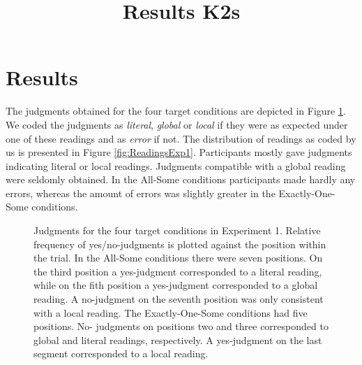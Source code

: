 \documentclass[a4paper,10pt]{article}
\title{Results K2s}
\author{}
\begin{document}
\maketitle

\begin{abstract}

\end{abstract}

\section{Results}
The judgments obtained for the four target conditions are depicted   in Figure \ref{fig:JudgmentsK2}.  We coded the judgments as {\it literal}, {\it global} or {\it local} if they were as expected under one of these readings and as {\it error} if not. The distribution of readings as coded by us is presented in Figure \ref{fig:ReadingsExp1}. Participants mostly gave judgments indicating literal or local readings. Judgments compatible with a global reading were seldomly obtained. In the All-Some conditions participants made hardly any errors, whereas the amount of errors was slightly greater in the Exactly-One-Some conditions.

\begin{figure}[h]
\centering
{}

\caption[Optional caption for list of figures]{Judgments for the four target conditions in Experiment 1. Relative frequency of yes/no-judgments is plotted against the position within the trial. In the All-Some conditions there were seven positions. On the third position a yes-judgment corresponded to a literal reading, while on the fith position a yes-judgment corresponded to a global reading.  A no-judgment on the seventh position was only consistent with a local reading. The Exactly-One-Some conditions had five positions. No- judgments on positions two and three corresponded to global and literal readings, respectively. A yes-judgment on the last segment  corresponded to a local reading. }
\label{fig:JudgmentsK2}
\end{figure}
\end{document}

